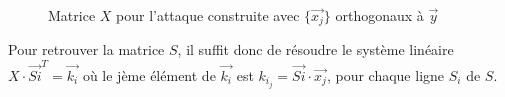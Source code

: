\documentclass[9pt]{extarticle}
\begin{document}
\begin{figure}[h]
\centering
{}
\caption{Matrice $X$ pour l'attaque construite avec $\{\vec{x_j}\}$ orthogonaux à $\vec{y}$}
\end{figure}




Pour retrouver la matrice $S$, il suffit donc de résoudre le système linéaire $X \cdot \vec{Si}^T = \vec{k_i}$ où le jème élément de $\vec{k_i}$ est $k_{i_j} = \vec{Si} \cdot \vec{x_j}$, pour chaque ligne $S_i$ de $S$.
\end{document}
